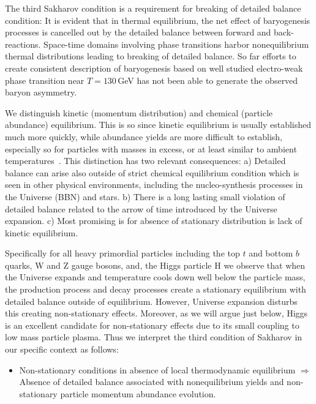 The third Sakharov condition is a requirement for breaking of detailed balance condition: It is evident that in thermal equilibrium, the net effect of baryogenesis processes is cancelled out by the detailed balance between forward and back-reactions. Space-time domains involving phase transitions harbor nonequilibrium thermal distributions leading to breaking of detailed balance. So far efforts to create consistent description of baryogenesis based on well studied electro-weak phase transition near $T=130$\,GeV has not been able to generate the observed baryon asymmetry. 

We distinguish kinetic (momentum distribution) and chemical (particle abundance) equilibrium. This is so since kinetic equilibrium is usually established much more quickly, while abundance yields are more difficult to establish, especially so for particles with masses in excess, or at least similar to ambient temperatures~\cite{Koch:1986ud,Birrell:2014gea}. This distinction has two relevant consequences: a) Detailed balance can arise also outside of strict chemical equilibrium condition which is seen in other physical environments, including the nucleo-synthesis processes in the Universe (BBN) and stars. b) There is a long lasting small violation of detailed balance related to the arrow of time introduced by the Universe expansion. c) Most promising is for absence of stationary distribution is lack of kinetic equilibrium. 

Specifically for all heavy primordial particles including the top $t$ and bottom $b$ quarks, W and Z gauge bosons, and, the Higgs particle H we observe that when the Universe expands and temperature cools down well below the particle mass, the production process and decay processes create a stationary equilibrium with detailed balance outside of equilibrium. However, Universe expansion disturbs this creating non-stationary effects. Moreover, as we will argue just below, Higgs is an excellent candidate for non-stationary effects due to its small coupling to low mass particle plasma. Thus we interpret the third condition of Sakharov in our specific context as follows:
\begin{itemize}
\item Non-stationary conditions in absence of local thermodynamic equilibrium $\Longrightarrow$ Absence of detailed balance associated with nonequilibrium yields and non-stationary particle momentum abundance evolution.
\end{itemize} 

